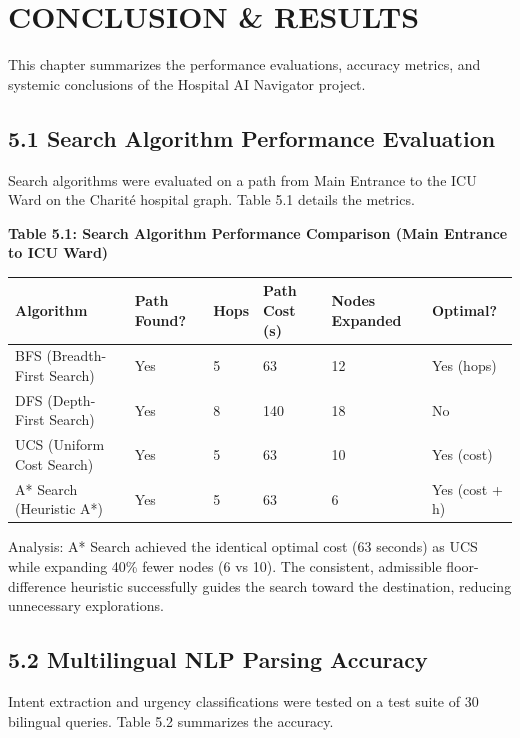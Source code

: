 \documentclass[12pt,a4paper]{report}
\begin{document}
\chapter{CONCLUSION \& RESULTS}

This chapter summarizes the performance evaluations, accuracy metrics, and systemic conclusions of the Hospital AI Navigator project.


\section{5.1 Search Algorithm Performance Evaluation}

Search algorithms were evaluated on a path from Main Entrance to the ICU Ward on the Charit\'{e} hospital graph. Table 5.1 details the metrics.


\begin{center}\textbf{Table 5.1: Search Algorithm Performance Comparison (Main Entrance to ICU Ward)}\end{center}
\begin{table}[htbp]
\centering
\small
\begin{tabularx}{\textwidth}{|X|l|l|l|l|l|}
\hline
Algorithm & Path Found? & Hops & Path Cost (s) & Nodes Expanded & Optimal? \\
\hline
\hline
BFS (Breadth-First Search) & Yes & 5 & 63 & 12 & Yes (hops) \\
\hline
DFS (Depth-First Search) & Yes & 8 & 140 & 18 & No \\
\hline
UCS (Uniform Cost Search) & Yes & 5 & 63 & 10 & Yes (cost) \\
\hline
A* Search (Heuristic A*) & Yes & 5 & 63 & 6 & Yes (cost + h) \\
\hline
\end{tabularx}
\end{table}
Analysis: A* Search achieved the identical optimal cost (63 seconds) as UCS while expanding 40\% fewer nodes (6 vs 10). The consistent, admissible floor-difference heuristic successfully guides the search toward the destination, reducing unnecessary explorations.


\section{5.2 Multilingual NLP Parsing Accuracy}

Intent extraction and urgency classifications were tested on a test suite of 30 bilingual queries. Table 5.2 summarizes the accuracy.
\end{document}

